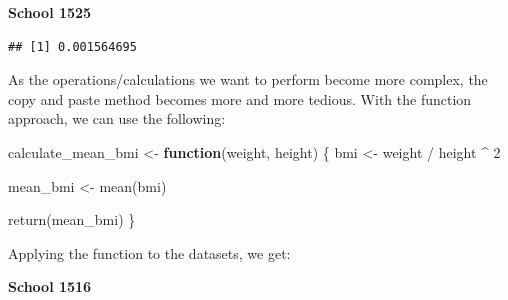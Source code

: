 \documentclass[
  12pt,
]{book}
\newenvironment{Shaded}{\begin{snugshade}}{\end{snugshade}}
\newcommand{\AttributeTok}[1]{\textcolor[rgb]{0.77,0.63,0.00}{#1}}
\newcommand{\ControlFlowTok}[1]{\textcolor[rgb]{0.13,0.29,0.53}{\textbf{#1}}}
\newcommand{\DecValTok}[1]{\textcolor[rgb]{0.00,0.00,0.81}{#1}}
\newcommand{\DocumentationTok}[1]{\textcolor[rgb]{0.56,0.35,0.01}{\textbf{\textit{#1}}}}
\newcommand{\FunctionTok}[1]{\textcolor[rgb]{0.00,0.00,0.00}{#1}}
\newcommand{\NormalTok}[1]{#1}
\newcommand{\OtherTok}[1]{\textcolor[rgb]{0.56,0.35,0.01}{#1}}
\newcommand{\SpecialCharTok}[1]{\textcolor[rgb]{0.00,0.00,0.00}{#1}}
\begin{document}
\textbf{School 1525}

\begin{Shaded}
\end{Shaded}

\begin{verbatim}
## [1] 0.001564695
\end{verbatim}

As the operations/calculations we want to perform become more complex, the copy and paste method becomes more and more tedious. With the function approach, we can use the following:

\begin{Shaded}
\begin{Highlighting}[]
\NormalTok{calculate\_mean\_bmi }\OtherTok{\textless{}{-}} \ControlFlowTok{function}\NormalTok{(weight, height) \{}
\NormalTok{  bmi }\OtherTok{\textless{}{-}}\NormalTok{ weight }\SpecialCharTok{/}\NormalTok{ height }\SpecialCharTok{\^{}} \DecValTok{2}
  
\NormalTok{  mean\_bmi }\OtherTok{\textless{}{-}} \FunctionTok{mean}\NormalTok{(bmi)}
  
  \FunctionTok{return}\NormalTok{(mean\_bmi)}
\NormalTok{\}}
\end{Highlighting}
\end{Shaded}

Applying the function to the datasets, we get:

\textbf{School 1516}

\begin{Shaded}
\end{Shaded}
\end{document}
